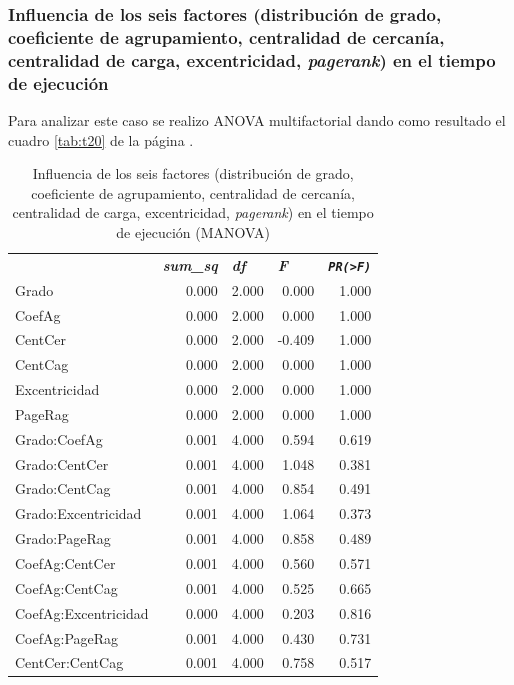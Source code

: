 \documentclass{article}
\begin{document}
\subsubsection{Influencia de los seis factores (distribución de grado, coeficiente de agrupamiento, centralidad de cercanía, centralidad de carga, excentricidad, \textit{pagerank}) en el tiempo de ejecución}
Para analizar este caso se realizo ANOVA multifactorial dando como resultado el cuadro \ref{tab:t20} de la página \pageref{tab:t20}.

\begin{table}[htbp]
  \centering
  \caption{Influencia de los seis factores (distribución de grado, coeficiente de agrupamiento, centralidad de cercanía, centralidad de carga, excentricidad, \textit{pagerank}) en el tiempo de ejecución (MANOVA)}
    \begin{tabular}{lrrrr}
          & \multicolumn{1}{l}{\textit{\textbf{sum\_sq}}} & \multicolumn{1}{l}{\textit{\textbf{df}}} & \multicolumn{1}{l}{\textit{\textbf{F}}} & \multicolumn{1}{l}{\textit{\textbf{\texttt{PR(>F)}}}} \\
    Grado & 0.000 & 2.000 & 0.000 & 1.000 \\
    CoefAg & 0.000 & 2.000 & 0.000 & 1.000 \\
    CentCer & 0.000 & 2.000 & -0.409 & 1.000 \\
    CentCag & 0.000 & 2.000 & 0.000 & 1.000 \\
    Excentricidad & 0.000 & 2.000 & 0.000 & 1.000 \\
    PageRag & 0.000 & 2.000 & 0.000 & 1.000 \\
    Grado:CoefAg & 0.001 & 4.000 & 0.594 & 0.619 \\
    Grado:CentCer & 0.001 & 4.000 & 1.048 & 0.381 \\
    Grado:CentCag & 0.001 & 4.000 & 0.854 & 0.491 \\
    Grado:Excentricidad & 0.001 & 4.000 & 1.064 & 0.373 \\
    Grado:PageRag & 0.001 & 4.000 & 0.858 & 0.489 \\
    CoefAg:CentCer & 0.001 & 4.000 & 0.560 & 0.571 \\
    CoefAg:CentCag & 0.001 & 4.000 & 0.525 & 0.665 \\
    CoefAg:Excentricidad & 0.000 & 4.000 & 0.203 & 0.816 \\
    CoefAg:PageRag & 0.001 & 4.000 & 0.430 & 0.731 \\
    CentCer:CentCag & 0.001 & 4.000 & 0.758 & 0.517 \\

\end{tabular}
\end{table}
\end{document}

